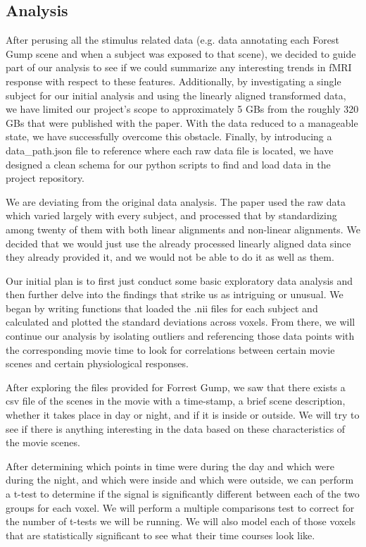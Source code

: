 \documentclass[11pt]{article}
\begin{document}
\subsection{Analysis} After perusing all the stimulus related data (e.g. data
annotating each Forest Gump scene and when a subject was exposed to that
scene), we decided to guide part of our analysis to see if we could summarize
any interesting trends in fMRI response with respect to these features.
Additionally, by investigating a single subject for our initial analysis  and
using the linearly aligned transformed data, we have limited our project’s
scope to approximately 5 GBs from the roughly 320 GBs that were published with
the paper. With the data reduced to a manageable state, we have successfully
overcome this obstacle. Finally, by introducing a data\_path.json file to
reference where each raw data file is located, we have designed a clean schema
for our python scripts to find and load data in the project repository.

We are deviating from the original data analysis. The paper used the raw data
which varied largely with every subject, and processed that by standardizing
among twenty of them with both linear alignments and non-linear alignments. We
decided that we would just use the already processed linearly aligned data
since they already provided it, and we would not be able to do it as well as
them.

Our initial plan is to first just conduct some basic exploratory data analysis
and then further delve into the findings that strike us as intriguing or
unusual. We began by writing functions that loaded the .nii files for each
subject and calculated and plotted the standard deviations across voxels. From
there, we will continue our analysis by isolating outliers and referencing
those data points with the corresponding movie time to look for correlations
between certain movie scenes and certain physiological responses.

After exploring the files provided for Forrest Gump, we saw that there exists
a csv file of the scenes in the movie with a time-stamp, a brief scene
description, whether it takes place in day or night, and if it is inside or
outside. We will try to see if there is anything interesting in the data based
on these characteristics of the movie scenes.

After determining which points in time were during the day and which were
during the night, and which were inside and which were outside, we can perform
a t-test to determine if the signal is significantly different between each of
the two groups for each voxel.  We will perform a multiple comparisons test to
correct for the number of t-tests we will be running.   We will also model
each of those voxels that are statistically significant to see what their time
courses look like.
\end{document}
